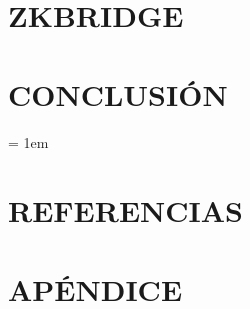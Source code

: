 \documentclass[12pt, oneside]{book}
\newif\ifpendientes
\begin{document}
\chapter{ZKBRIDGE}
\label{chp:zkbridge}
\thispagestyle{empty}







\chapter{CONCLUSIÓN} \label{chp:conclusion}
\thispagestyle{empty}


\chapterformattitleonly

\emergencystretch = 1em
\chapter*{REFERENCIAS}
\printbibliography[heading=none]

\appendix
\chapter*{APÉNDICE}
\renewcommand{\thechapter}{A}


\ifpendientes
\chapter*{PENDIENTES}
\addcontentsline{toc}{chapter}{PENDIENTES}

\fi

\printindex

%
\end{document}
